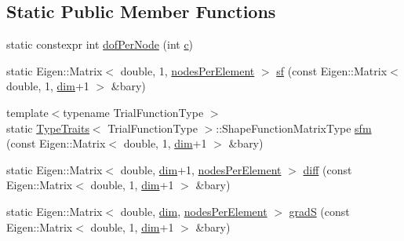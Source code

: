 \subsection*{Static Public Member Functions}
\begin{DoxyCompactItemize}
\item 
static constexpr int \hyperlink{classmodel_1_1_lagrange_element_a9cf5defd048fbfad9e456fa19051808e}{dof\+Per\+Node} (int \hyperlink{plot_cells_8m_aa49cfdd4fa4d74d71f78a001a1b635d0}{c})
\item 
static Eigen\+::\+Matrix$<$ double, 1, \hyperlink{classmodel_1_1_lagrange_element_a8f86452dcb9f1cc89fdbc0219c397d05}{nodes\+Per\+Element} $>$ \hyperlink{classmodel_1_1_lagrange_element_ae9d6d4b2f57c20ca5aabd7ebed09816b}{sf} (const Eigen\+::\+Matrix$<$ double, 1, \hyperlink{classmodel_1_1_lagrange_element_a56d161032b73c07c77326cfba73d731d}{dim}+1 $>$ \&bary)
\item 
{\footnotesize template$<$typename Trial\+Function\+Type $>$ }\\static \hyperlink{structmodel_1_1_type_traits}{Type\+Traits}$<$ Trial\+Function\+Type $>$\+::Shape\+Function\+Matrix\+Type \hyperlink{classmodel_1_1_lagrange_element_a78dc254d79c124ec6584183351742ba3}{sfm} (const Eigen\+::\+Matrix$<$ double, 1, \hyperlink{classmodel_1_1_lagrange_element_a56d161032b73c07c77326cfba73d731d}{dim}+1 $>$ \&bary)
\item 
static Eigen\+::\+Matrix$<$ double, \hyperlink{classmodel_1_1_lagrange_element_a56d161032b73c07c77326cfba73d731d}{dim}+1, \hyperlink{classmodel_1_1_lagrange_element_a8f86452dcb9f1cc89fdbc0219c397d05}{nodes\+Per\+Element} $>$ \hyperlink{classmodel_1_1_lagrange_element_a50b74111dcfc1c6f40ec9db08c7a764b}{diff} (const Eigen\+::\+Matrix$<$ double, 1, \hyperlink{classmodel_1_1_lagrange_element_a56d161032b73c07c77326cfba73d731d}{dim}+1 $>$ \&bary)
\item 
static Eigen\+::\+Matrix$<$ double, \hyperlink{classmodel_1_1_lagrange_element_a56d161032b73c07c77326cfba73d731d}{dim}, \hyperlink{classmodel_1_1_lagrange_element_a8f86452dcb9f1cc89fdbc0219c397d05}{nodes\+Per\+Element} $>$ \hyperlink{classmodel_1_1_lagrange_element_a15d65f1427ddb71895d3880600950a07}{grad\+S} (const Eigen\+::\+Matrix$<$ double, 1, \hyperlink{classmodel_1_1_lagrange_element_a56d161032b73c07c77326cfba73d731d}{dim}+1 $>$ \&bary)
\end{DoxyCompactItemize}
